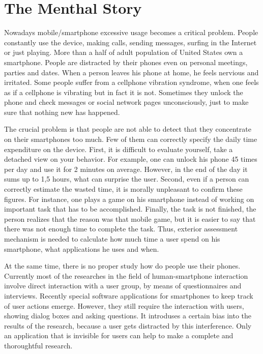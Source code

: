 \chapter{The Menthal Story}
\label{chap:menthal_story}
Nowadays mobile/smartphone excessive usage becomes a critical problem.
People constantly use the device, making calls, sending messages, surfing in the Internet or just playing.
More than a half of adult population of United States own a smartphone.
People are distracted by their phones even on personal meetings, parties and dates.
When a person leaves his phone at home, he feels nervious and irritated.
Some people suffer from a cellphone vibration syndrome, when one feels as if a cellphone is vibrating but in fact it is not.
Sometimes they unlock the phone and check messages or social network pages unconsciously, just to make sure that nothing new has happened. 

The crucial problem is that people are not able to detect that they concentrate on their smartphones too much.
Few of them can correctly specify the daily time expenditure on the device.
First, it is difficult to evaluate yourself, take a detached view on your behavior.
For example, one can unlock his phone 45 times per day and use it for 2 minutes on average.
However, in the end of the day it sums up to 1,5 hours, what can surprise the user.
Second, even if a person can correctly estimate the wasted time, it is morally unpleasant to confirm these figures.
For instance, one plays a game on his smartphone instead of working on important task that has to be accomplished.
Finally, the task is not finished, the person realizes that the reason was that mobile game, but it is easier to say that there was not enough time to complete the task.  
Thus, exterior assessment mechanism is needed to calculate how much time a user spend on his smartphone, what applications he uses and when.    

At the same time, there is no proper study how do people use their phones.
Currently most of the researches in the field of human-smartphone interaction involve direct interaction with a user group, by means of questionnaires and interviews.
Recently special software applications for smartphones to keep track of user actions emerge.
However, they still require the interaction with users, showing dialog boxes and asking questions.
It introduses a certain bias into the results of the research, because a user gets distracted by this interference.
Only an application that is invisible for users can help to make a complete and thoroughtful research.

